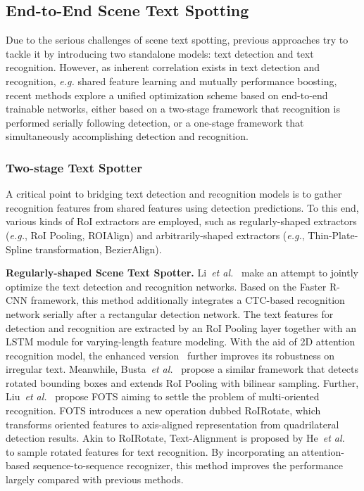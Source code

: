 \documentclass[10pt,journal,compsoc]{IEEEtran}
\def\etal{{\it et al.}\xspace}
\def\eg{{\it e.g.}\xspace}
\begin{document}
\subsection{End-to-End Scene Text Spotting} 

Due to the serious challenges of scene text spotting, previous approaches try to tackle it by introducing two standalone models: text detection and text recognition. However, as inherent correlation exists in text detection and recognition, \eg shared feature learning and mutually performance boosting, recent methods explore a unified optimization scheme based on end-to-end trainable networks, either based on a two-stage framework that recognition is performed serially following detection, or a one-stage framework that simultaneously accomplishing detection and recognition. 

\subsubsection{Two-stage Text Spotter}

A critical point to bridging text detection and recognition models is to gather recognition features from shared features using detection predictions. To this end, various kinds of RoI extractors are employed, such as regularly-shaped extractors (\eg, RoI Pooling, ROIAlign) and arbitrarily-shaped extractors (\eg, Thin-Plate-Spline transformation, BezierAlign).

\noindent\textbf{Regularly-shaped Scene Text Spotter.} Li~\etal~\cite{li2017towards} make an attempt to jointly optimize the text detection and recognition networks. Based on the Faster R-CNN framework, this method additionally integrates a CTC-based recognition network serially after a rectangular detection network. The text features for detection and recognition are extracted by an RoI Pooling layer together with an LSTM module for varying-length feature modeling. With the aid of 2D attention recognition model, the enhanced version~\cite{wang2021towards} further improves its robustness on irregular text. Meanwhile, Busta~\etal~\cite{busta2017deep} propose a similar framework that detects rotated bounding boxes and extends RoI Pooling with bilinear sampling. Further, Liu~\etal~\cite{liu2018fots} propose FOTS aiming to settle the problem of multi-oriented recognition. FOTS introduces a new operation dubbed RoIRotate, which transforms oriented features to axis-aligned representation from quadrilateral detection results. Akin to RoIRotate, Text-Alignment is proposed by He~\etal~\cite{he2018end} to sample rotated features for text recognition. By incorporating an attention-based sequence-to-sequence recognizer, this method improves the performance largely compared with previous methods.
\end{document}
